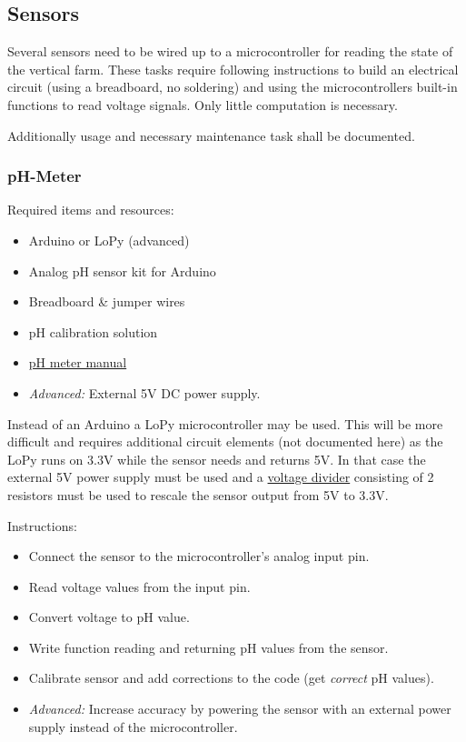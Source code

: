 \documentclass[a4paper]{article}
\begin{document}
\subsection{Sensors}

Several sensors need to be wired up to a microcontroller for reading the state
of the vertical farm. These tasks require following instructions to build an
electrical circuit (using a breadboard, no soldering) and using the microcontrollers
built-in functions to read voltage signals. Only little computation is necessary.

Additionally usage and necessary maintenance task shall be documented.


\subsubsection{pH-Meter}

Required items and resources:
\begin{itemize}
 \item Arduino or LoPy (advanced)
 \item Analog pH sensor kit for Arduino
 \
 \item Breadboard \& jumper wires
 \item pH calibration solution
 \item \href{https://www.dfrobot.com/wiki/index.php/PH_meter(SKU:_SEN0161)}{pH meter manual}
 \item \textit{Advanced:} External 5V DC power supply.
\end{itemize}

Instead of an Arduino a LoPy microcontroller may be used. This will be more difficult and
requires additional circuit elements (not documented here) as the LoPy runs on 3.3V while
the sensor needs and returns 5V. In that case the external 5V power supply must be used and
a \href{https://www.allaboutcircuits.com/tools/voltage-divider-calculator/}{voltage divider}
consisting of 2 resistors must be used to rescale the sensor output from 5V to 3.3V.

Instructions:
\begin{itemize}
 \item Connect the sensor to the microcontroller's analog input pin.
 \item Read voltage values from the input pin.
 \item Convert voltage to pH value.
 \item Write function reading and returning pH values from the sensor.
 \item Calibrate sensor and add corrections to the code (get \textit{correct} pH values).
 \item \textit{Advanced:} Increase accuracy by powering the sensor with an external power supply instead of the microcontroller.
\end{itemize}
\end{document}
